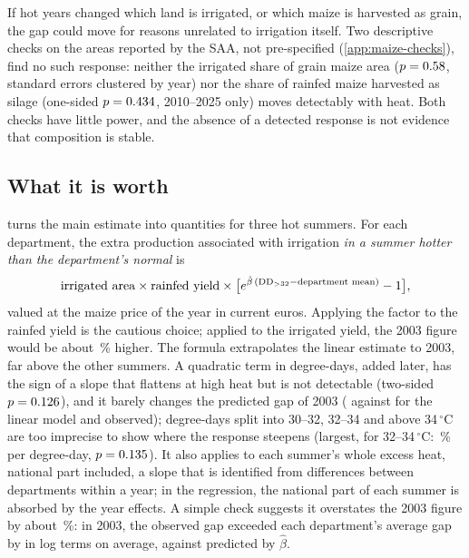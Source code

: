 If hot years changed which land is irrigated, or which maize is harvested as grain, the gap could move for reasons unrelated to irrigation itself. Two descriptive checks on the areas reported by the SAA, not pre-specified (\cref{app:maize-checks}), find no such response: neither the irrigated share of grain maize area ($p = 0.58$, standard errors clustered by year) nor the share of rainfed maize harvested as silage (one-sided $p = 0.434$, 2010--2025 only) moves detectably with heat. Both checks have little power, and the absence of a detected response is not evidence that composition is stable.

\subsection{What it is worth}
\label{subsec:maize-value}

 turns the main estimate into quantities for three hot summers. For each department, the extra production associated with irrigation \emph{in a summer hotter than the department's normal} is
\[
\text{irrigated area} \times \text{rainfed yield} \times \big[e^{\hat\beta\,(\mathrm{DD}_{>32} - \text{department mean})} - 1\big],
\]
valued at the maize price of the year in current euros. Applying the factor to the rainfed yield is the cautious choice; applied to the irrigated yield, the 2003 figure would be about \ValAltPct\,\% higher. The formula extrapolates the linear estimate to 2003, far above the other summers. A quadratic term in degree-days, added later, has the sign of a slope that flattens at high heat but is not detectable (two-sided $p = 0.126$), and it barely changes the predicted gap of 2003 (\QuadPredThree{} against \LinPredThree{} for the linear model and \ObsThree{} observed); degree-days split into 30--32, 32--34 and above 34\,$^{\circ}$C are too imprecise to show where the response steepens (largest, for 32--34\,$^{\circ}$C: \BinMidPct\,\% per degree-day, $p = 0.135$). It also applies to each summer's whole excess heat, national part included, a slope that is identified from differences between departments within a year; in the regression, the national part of each summer is absorbed by the year effects. A simple check suggests it overstates the 2003 figure by about \ValOverPct\,\%: in 2003, the observed gap exceeded each department's average gap by \GapObsTwoThousandThree{} in log terms on average, against \GapPredTwoThousandThree{} predicted by $\hat\beta$.

